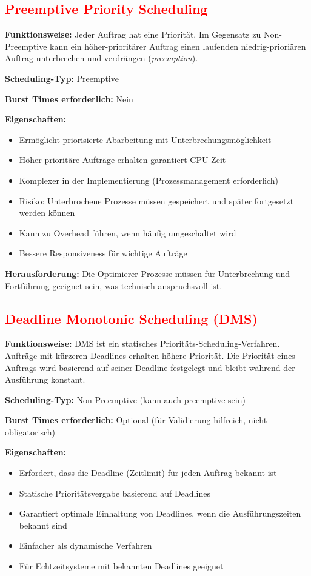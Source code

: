 \subsection{\textcolor{red}{Preemptive Priority Scheduling}}

\textbf{Funktionsweise:} Jeder Auftrag hat eine Priorität. Im Gegensatz zu Non-Preemptive kann ein höher-prioritärer Auftrag einen laufenden niedrig-prioriären Auftrag unterbrechen und verdrängen (\textit{preemption}).

\textbf{Scheduling-Typ:} Preemptive

\textbf{Burst Times erforderlich:} Nein

\textbf{Eigenschaften:}
\begin{itemize}
    \item Ermöglicht priorisierte Abarbeitung mit Unterbrechungsmöglichkeit
    \item Höher-prioritäre Aufträge erhalten garantiert CPU-Zeit
    \item Komplexer in der Implementierung (Prozessmanagement erforderlich)
    \item Risiko: Unterbrochene Prozesse müssen gespeichert und später fortgesetzt werden können
    \item Kann zu Overhead führen, wenn häufig umgeschaltet wird
    \item Bessere Responsiveness für wichtige Aufträge
\end{itemize}

\textbf{Herausforderung:} Die Optimierer-Prozesse müssen für Unterbrechung und Fortführung geeignet sein, was technisch anspruchsvoll ist.

\subsection{\textcolor{red}{Deadline Monotonic Scheduling (DMS)}}

\textbf{Funktionsweise:} DMS ist ein statisches Prioritäts-Scheduling-Verfahren. Aufträge mit kürzeren Deadlines erhalten höhere Priorität. Die Priorität eines Auftrags wird basierend auf seiner Deadline festgelegt und bleibt während der Ausführung konstant.

\textbf{Scheduling-Typ:} Non-Preemptive (kann auch preemptive sein)

\textbf{Burst Times erforderlich:} Optional (für Validierung hilfreich, nicht obligatorisch)

\textbf{Eigenschaften:}
\begin{itemize}
    \item Erfordert, dass die Deadline (Zeitlimit) für jeden Auftrag bekannt ist
    \item Statische Prioritätsvergabe basierend auf Deadlines
    \item Garantiert optimale Einhaltung von Deadlines, wenn die Ausführungszeiten bekannt sind
    \item Einfacher als dynamische Verfahren
    \item Für Echtzeitsysteme mit bekannten Deadlines geeignet
\end{itemize}

